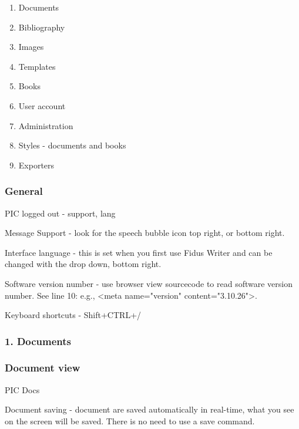 \documentclass{article}
\begin{document}
\begin{enumerate}
\item Documents


\item Bibliography


\item Images


\item Templates


\item Books


\item User account


\item Administration


\item Styles - documents and books


\item Exporters


\end{enumerate}

\subsubsection{General }\label{H1068085}



PIC logged out - support, lang


Message Support - look for the speech bubble icon top right, or bottom right.


Interface language - this is set when you first use Fidus Writer and can be changed with the drop down, bottom right.


Software version number - use browser view sourcecode to read software version number. See line 10: e.g., <meta name="version" content="3.10.26">.


Keyboard shortcuts - Shift+CTRL+/


\subsubsection{1. Documents}\label{H1552973}



\subsubsection{Document view}\label{H2380763}



PIC Docs


Document saving - document are saved automatically in real-time, what you see on the screen will be saved. There is no need to use a save command.
\end{document}
